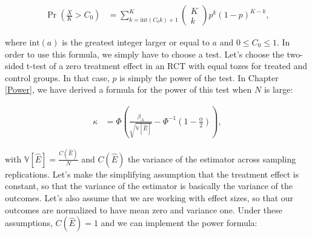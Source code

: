 \documentclass[
]{book}
\newcommand{\var}[1]{\mathbb{V}[ #1 ]}
\theoremstyle{definition}
\theoremstyle{definition}
\theoremstyle{definition}
\theoremstyle{definition}
\theoremstyle{remark}
\begin{document}
\begin{align*}
  \Pr(\frac{X}{K}>C_0) & = \sum_{k=\text{int}(C_{0}k)+1}^{K}\left(\begin{array}{c}K\\k\end{array}\right)p^k(1-p)^{K-k},
\end{align*}

where \(\text{int}(a)\) is the greatest integer larger or equal to \(a\) and \(0\leq C_0\leq 1\).
In order to use this formula, we simply have to choose a test.
Let's choose the two-sided t-test of a zero treatment effect in an RCT with equal tozes for treated and control groups.
In that case, \(p\) is simply the power of the test.
In Chapter \ref{Power}, we have derived a formula for the power of this test when \(N\) is large:

\begin{align*}
  \kappa & = \Phi\left(\frac{\beta_A}{\sqrt{\var{\hat{E}}}}-\Phi^{-1}\left(1-\frac{\alpha}{2}\right)\right),
\end{align*}

with \(\var{\hat{E}}=\frac{C(\hat{E})}{N}\) and \(C(\hat{E})\) the variance of the estimator across sampling replications.
Let's make the simplifying assumption that the treatment effect is constant, so that the variance of the estimator is basically the variance of the outcomes.
Let's also assume that we are working with effect sizes, so that our outcomes are normalized to have mean zero and variance one.
Under these assumptions, \(C(\hat{E})=1\) and we can implement the power formula:
\end{document}
